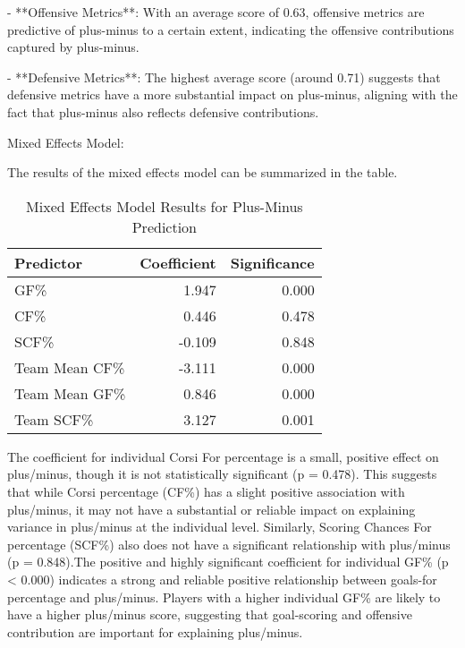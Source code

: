 \documentclass[12pt]{article}
\begin{document}
- **Offensive Metrics**: With an average score of 0.63, offensive metrics are predictive of plus-minus to a certain extent, indicating 
the offensive contributions captured by plus-minus.

- **Defensive Metrics**: The highest average score (around 0.71) suggests that defensive metrics have a more substantial impact on 
plus-minus, aligning with the fact that plus-minus also reflects defensive contributions.

Mixed Effects Model:

The results of the mixed effects model can be summarized in the table.

\begin{table}[tbp]
  \caption{Mixed Effects Model Results for Plus-Minus Prediction}
  \label{tab:mixed-effects}
  \centering
  \begin{tabular}{lrr}
    \toprule
    Predictor & Coefficient & Significance \\ 
    \midrule
    GF\% & 1.947 & 0.000 \\
    CF\% & 0.446 & 0.478 \\
    SCF\% & -0.109 & 0.848 \\
    Team Mean CF\% & -3.111 & 0.000 \\ 
    Team Mean GF\% & 0.846 & 0.000 \\
    Team SCF\% & 3.127 & 0.001 \\ 
    \bottomrule
\end{tabular}
\end{table}

The coefficient for individual Corsi For percentage is a small, positive effect on plus/minus, though it is not statistically significant 
(p = 0.478). This suggests that while Corsi percentage (CF\%) has a slight positive association with plus/minus, it may not have a 
substantial or reliable impact on explaining variance in plus/minus at the individual level. Similarly, Scoring Chances For percentage 
(SCF\%) also does not have a significant relationship with plus/minus (p = 0.848).The positive and highly significant coefficient
for individual GF\% (p < 0.000) indicates a strong and reliable positive relationship between goals-for percentage and plus/minus. 
Players with a higher individual GF\% are likely to have a higher plus/minus score, suggesting that goal-scoring and offensive contribution 
are important for explaining plus/minus. 
\end{document}
